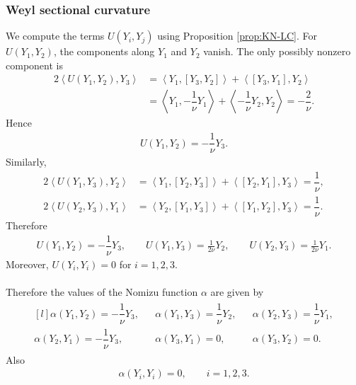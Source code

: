 \documentclass[12pt]{article}
\begin{document}
\subsubsection{Weyl sectional curvature}

We  compute the terms $U(Y_i,Y_j)$ using Proposition \ref{prop:KN-LC}. For $U(Y_1,Y_2)$, the components along $Y_1$ and $Y_2$ vanish. The only possibly nonzero component is
\begin{align*}
    2\left\langle U(Y_1,Y_2),Y_3 \right\rangle
    &=\left\langle Y_1,[Y_3,Y_2] \right\rangle+\left\langle [Y_3,Y_1],Y_2 \right\rangle \\
    &=\left\langle Y_1,-\dfrac{1}{\nu}Y_1 \right\rangle+\left\langle -\dfrac{1}{\nu}Y_2,Y_2 \right\rangle
    =-\dfrac{2}{\nu}.
\end{align*}
Hence
\begin{align*}
    U(Y_1,Y_2)=-\dfrac{1}{\nu}Y_3.
\end{align*}
Similarly,
\begin{align*}
    2\left\langle U(Y_1,Y_3),Y_2 \right\rangle
    &=\left\langle Y_1,[Y_2,Y_3] \right\rangle+\left\langle [Y_2,Y_1],Y_3 \right\rangle=\dfrac{1}{\nu}, \\
    2\left\langle U(Y_2,Y_3),Y_1 \right\rangle
    &=\left\langle Y_2,[Y_1,Y_3] \right\rangle+\left\langle [Y_1,Y_2],Y_3 \right\rangle=\dfrac{1}{\nu}.
\end{align*}
Therefore
\begin{align*}
    U(Y_1,Y_2)=-\dfrac{1}{\nu}Y_3,
    \qquad
    U(Y_1,Y_3)=\frac{1}{2\nu}Y_2,
    \qquad
    U(Y_2,Y_3)=\frac{1}{2\nu}Y_1.
\end{align*}
Moreover, $U(Y_i,Y_i)=0$ for $i=1,2,3$. \\~\\
Therefore the values of the Nomizu function $\alpha$ are given by
\begin{align*}
\begin{matrix*}[l]
    \alpha(Y_1,Y_2)=-\dfrac{1}{\nu}Y_3, &&     \alpha(Y_1,Y_3)=\dfrac{1}{\nu}Y_2, &&  \alpha(Y_2,Y_3)=\dfrac{1}{\nu}Y_1, \\[1em]
    \alpha(Y_2,Y_1)=-\dfrac{1}{\nu}Y_3, && 
    \alpha(Y_3,Y_1)=0, &&
    \alpha(Y_3,Y_2)=0.
\end{matrix*}
\end{align*}
Also
\begin{align*}
    \alpha(Y_i,Y_i)=0,\qquad i=1,2,3.
\end{align*}
\end{document}
